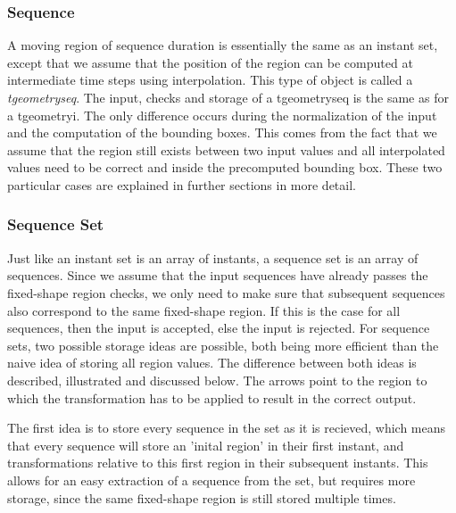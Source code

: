 			
		\subsubsection{Sequence}
		
		A moving region of sequence duration is essentially the same as an instant set, except that we assume that the position of the region can be computed at intermediate time steps using interpolation. This type of object is called a \textit{tgeometryseq}. The input, checks and storage of a tgeometryseq is the same as for a tgeometryi. The only difference occurs during the normalization of the input and the computation of the bounding boxes. This comes from the fact that we assume that the region still exists between two input values and all interpolated values need to be correct and inside the precomputed bounding box. These two particular cases are explained in further sections in more detail.
		
		
		\subsubsection{Sequence Set}
		
		Just like an instant set is an array of instants, a sequence set is an array of sequences. Since we assume that the input sequences have already passes the fixed-shape region checks, we only need to make sure that subsequent sequences also correspond to the same fixed-shape region. If this is the case for all sequences, then the input is accepted, else the input is rejected. For sequence sets, two possible storage ideas are possible, both being more efficient than the naive idea of storing all region values. The difference between both ideas is described, illustrated and discussed below. The arrows point to the region to which the transformation has to be applied to result in the correct output.
		
		
		The first idea is to store every sequence in the set as it is recieved, which means that every sequence will store an 'inital region' in their first instant, and transformations relative to this first region in their subsequent instants. This allows for an easy extraction of a sequence from the set, but requires more storage, since the same fixed-shape region is still stored multiple times.
		
